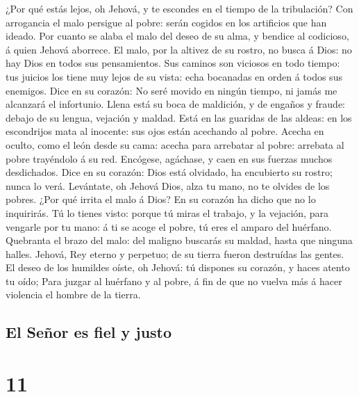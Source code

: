  ¿Por qué estás lejos, oh Jehová, y te escondes en el
tiempo de la tribulación?  Con arrogancia el malo persigue
al pobre: serán cogidos en los artificios que han ideado. 
Por cuanto se alaba el malo del deseo de su alma, y bendice al
codicioso, á quien Jehová aborrece.  El malo, por la
altivez de su rostro, no busca á Dios: no hay Dios en todos sus
pensamientos.  Sus caminos son viciosos en todo tiempo:
tus juicios los tiene muy lejos de su vista: echa bocanadas en orden á
todos sus enemigos.  Dice en su corazón: No seré movido en
ningún tiempo, ni jamás me alcanzará el infortunio.  Llena
está su boca de maldición, y de engaños y fraude: debajo de su lengua,
vejación y maldad.  Está en las guaridas de las aldeas: en
los escondrijos mata al inocente: sus ojos están acechando al pobre.
 Acecha en oculto, como el león desde su cama: acecha para
arrebatar al pobre: arrebata al pobre trayéndolo á su red.
 Encógese, agáchase, y caen en sus fuerzas muchos
desdichados.  Dice en su corazón: Dios está olvidado, ha
encubierto su rostro; nunca lo verá.  Levántate, oh
Jehová Dios, alza tu mano, no te olvides de los pobres. 
¿Por qué irrita el malo á Dios? En su corazón ha dicho que no lo
inquirirás.  Tú lo tienes visto: porque tú miras el
trabajo, y la vejación, para vengarle por tu mano: á ti se acoge el
pobre, tú eres el amparo del huérfano.  Quebranta el
brazo del malo: del maligno buscarás su maldad, hasta que ninguna
halles.  Jehová, Rey eterno y perpetuo; de su tierra
fueron destruídas las gentes.  El deseo de los humildes
oíste, oh Jehová: tú dispones su corazón, y haces atento tu oído;
 Para juzgar al huérfano y al pobre, á fin de que no
vuelva más á hacer violencia el hombre de la tierra.

\hypertarget{el-seuxf1or-es-fiel-y-justo}{%
\subsection{El Señor es fiel y
justo}\label{el-seuxf1or-es-fiel-y-justo}}

\hypertarget{section-10}{%
\section{11}\label{section-10}}

